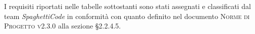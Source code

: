 \documentclass[../analisi_dei_requisiti.tex]{subfiles}
\begin{document}
I requisiti riportati nelle tabelle sottostanti sono stati assegnati e classificati dal team \emph{SpaghettiCode} in conformità con quanto definito 
nel documento \textsc{Norme di Progetto v2.3.0} alla sezione \S2.2.4.5.



\newpage



\newpage



\newpage



\newpage



\newpage



\newpage


\end{document}
